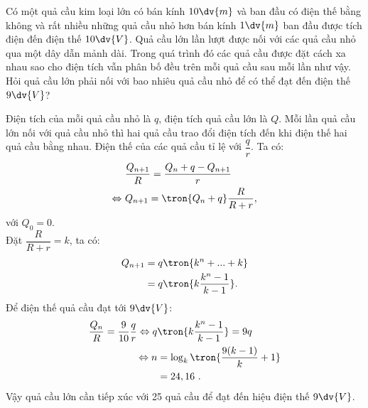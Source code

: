     
    \begin{vd}
    Có một quả cầu kim loại lớn có bán kính $10\dv{m}$ và ban đầu có điện thế bằng không và rất nhiều những quả cầu nhỏ hơn bán kính $1\dv{m}$ ban đầu được tích điện đến điện thế $10\dv{V}$. Quả cầu lớn lần lượt được nối với các quả cầu nhỏ qua một dây dẫn mảnh dài. Trong quá trình đó các quả cầu được đặt cách xa nhau sao cho điện tích vẫn phân bố đều trên mỗi quả cầu sau mỗi lần như vậy. Hỏi quả cầu lớn phải nối với bao nhiêu quả cầu nhỏ để có thể đạt đến điện thế $9\dv{V}$?
    \end{vd}
    \begin{loigiai}
    Điện tích của mỗi quả cầu nhỏ là $q$, điện tích quả cầu lớn là $Q$. Mỗi lần quả cầu lớn nối với quả cầu nhỏ thì hai quả cầu trao đổi điện tích đến khi điện thế hai quả cầu bằng nhau. Điện thế của các quả cầu tỉ lệ với $\dfrac{q}{r}$.
    Ta có:
    \begin{equation*}
    \begin{aligned}
        &\frac{Q_{n+1}}{R}=\dfrac{Q_n+q-Q_{n+1}}{r}\\
        \Leftrightarrow \ & Q_{n+1}=\tron{Q_{n}+q}\dfrac{R}{R+r},
    \end{aligned}
    \end{equation*}
    với $Q_0=0$. \\
    Đặt $\dfrac{R}{R+r}=k$, ta có:
    \begin{equation*}
    \begin{aligned}
          Q_{n+1}&=q\tron{k^n+...+k}\\
          &=q\tron{k\dfrac{k^n-1}{k-1}}.
    \end{aligned}
    \end{equation*}
    Để điện thế quả cầu đạt tới $9\dv{V}$:
    \begin{equation*}
        \begin{aligned}
            \frac{Q_n}{R}=\frac{9}{10}\frac{q}{r}
            \Leftrightarrow q&\tron{k\dfrac{k^n-1}{k-1}}=9q\\
            \Leftrightarrow n&=\log_k\tron{\frac{9(k-1)}{k}+1}\\
            &=24,16\ .
        \end{aligned}
    \end{equation*}
    Vậy quả cầu lớn cần tiếp xúc với 25 quả cầu để đạt đến hiệu điện thế $9\dv{V}$.
    \end{loigiai}
    
